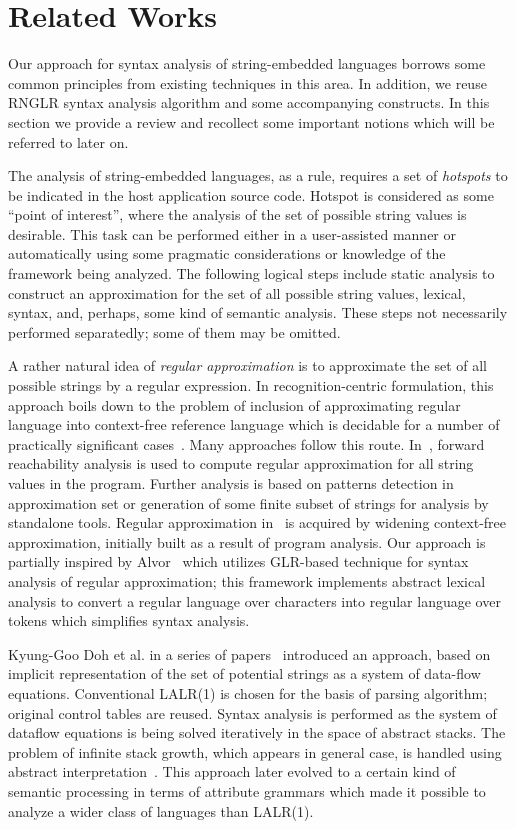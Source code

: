 \section{Related Works}

Our approach for syntax analysis of string-embedded languages borrows some common principles
from existing techniques in this area. In addition, we reuse RNGLR syntax analysis algorithm 
and some accompanying constructs. In this section we provide a review and recollect some important
notions which will be referred to later on. 

The analysis of string-embedded languages, as a rule, requires a set of \emph{hotspots} to
be indicated in the host application source code. Hotspot is considered as some ``point 
of interest'', where the analysis of the set of possible string values is desirable. This task can be
performed either in a user-assisted manner or automatically using some pragmatic 
considerations or knowledge of the framework being analyzed. The following logical steps 
include static analysis to construct an approximation for the set of all possible string values,
lexical, syntax, and, perhaps, some kind of semantic analysis. These steps not
necessarily performed separatedly; some of them may be omitted.

A rather natural idea of \emph{regular approximation} is to approximate the set of all possible 
strings by a regular expression. In recognition-centric formulation, this approach boils down to
the problem of inclusion of approximating regular language into context-free reference language which
is decidable for a number of practically significant cases~\cite{LangInclusion}.
Many approaches follow this route. In~\cite{Stranger}, forward reachability analysis is used to compute regular 
approximation for all string values in the program. Further analysis is based on patterns detection in approximation 
set or generation of some finite subset of strings for analysis by standalone tools. Regular approximation in~\cite{JSA} 
is acquired by widening context-free approximation, initially built as a result of program analysis. 
Our approach is partially inspired by Alvor~\cite{Alvor,ALVOR2} which utilizes GLR-based technique for syntax 
analysis of regular approximation; this framework implements abstract lexical analysis to convert a
regular language over characters into regular language over tokens which simplifies syntax analysis.

Kyung-Goo Doh et al. in a series of papers~\cite{AbstrParsing,LRAbstrParsing,LRAbstrParsingSema} introduced an
approach, based on implicit representation of the set of potential strings as a system of data-flow equations. 
Conventional LALR(1) is chosen for the basis of parsing algorithm; original control tables are reused. 
Syntax analysis is performed as the system of dataflow equations is being solved iteratively in the space of abstract stacks.
The problem of infinite stack growth, which appears in general case, is handled using abstract 
interpretation~\cite{AbstractInterpretation}. This approach later evolved to a certain kind of semantic processing
in terms of attribute grammars which made it possible to analyze a wider class of languages than
LALR(1).

